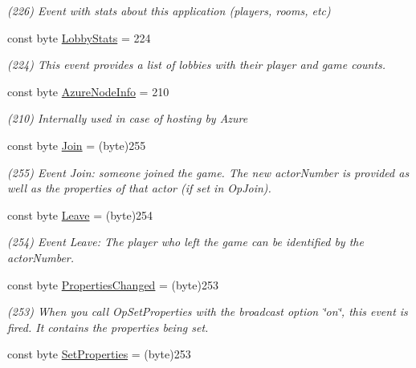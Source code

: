\begin{DoxyCompactItemize}
\begin{DoxyCompactList}\small\item\em (226) Event with stats about this application (players, rooms, etc)\end{DoxyCompactList}\item 
const byte \hyperlink{class_exit_games_1_1_client_1_1_photon_1_1_event_code_af1be950c284d416e8a91433c0cb2e9d4}{Lobby\+Stats} = 224
\begin{DoxyCompactList}\small\item\em (224) This event provides a list of lobbies with their player and game counts.\end{DoxyCompactList}\item 
const byte \hyperlink{class_exit_games_1_1_client_1_1_photon_1_1_event_code_aac53b6b53140c724713d30add1c116cf}{Azure\+Node\+Info} = 210
\begin{DoxyCompactList}\small\item\em (210) Internally used in case of hosting by Azure\end{DoxyCompactList}\item 
const byte \hyperlink{class_exit_games_1_1_client_1_1_photon_1_1_event_code_a27fcfba85aa603b1f153cc7f102acb84}{Join} = (byte)255
\begin{DoxyCompactList}\small\item\em (255) Event Join\+: someone joined the game. The new actor\+Number is provided as well as the properties of that actor (if set in Op\+Join).\end{DoxyCompactList}\item 
const byte \hyperlink{class_exit_games_1_1_client_1_1_photon_1_1_event_code_ae060da1572222a61fd822406e5df1ef2}{Leave} = (byte)254
\begin{DoxyCompactList}\small\item\em (254) Event Leave\+: The player who left the game can be identified by the actor\+Number.\end{DoxyCompactList}\item 
const byte \hyperlink{class_exit_games_1_1_client_1_1_photon_1_1_event_code_a8a72126057d0a742d14a2013a1f3415a}{Properties\+Changed} = (byte)253
\begin{DoxyCompactList}\small\item\em (253) When you call Op\+Set\+Properties with the broadcast option \char`\"{}on\char`\"{}, this event is fired. It contains the properties being set.\end{DoxyCompactList}\item 
const byte \hyperlink{class_exit_games_1_1_client_1_1_photon_1_1_event_code_a922342a5a2475fccf3e2eb887059d7bf}{Set\+Properties} = (byte)253

\end{DoxyCompactItemize}

